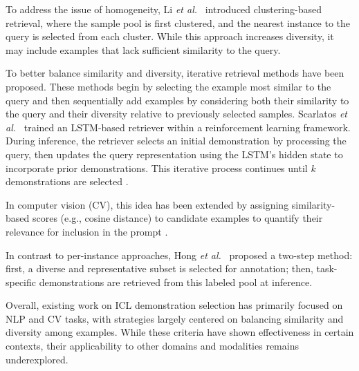 \documentclass[journal,twocolumn]{IEEEtran}
\begin{document}
To address the issue of homogeneity, Li \textit{et al.}~\cite{li-etal-2024-self-prompting} introduced clustering-based retrieval, where the sample pool is first clustered, and the nearest instance to the query is selected from each cluster. While this approach increases diversity, it may include examples that lack sufficient similarity to the query.

To better balance similarity and diversity, iterative retrieval methods have been proposed. These methods begin by selecting the example most similar to the query and then sequentially add examples by considering both their similarity to the query and their diversity relative to previously selected samples. Scarlatos \textit{et al.}~\cite{scarlatos2023reticl} trained an LSTM-based retriever within a reinforcement learning framework. During inference, the retriever selects an initial demonstration by processing the query, then updates the query representation using the LSTM's hidden state to incorporate prior demonstrations. This iterative process continues until $k$ demonstrations are selected \cite{luo2024context}.

In computer vision (CV), this idea has been extended by assigning similarity-based scores (e.g., cosine distance) to candidate examples to quantify their relevance for inclusion in the prompt \cite{zhang2023makes}.

In contrast to per-instance approaches, Hong \textit{et al.}~\cite{hongjin2022selective} proposed a two-step method: first, a diverse and representative subset is selected for annotation; then, task-specific demonstrations are retrieved from this labeled pool at inference.

Overall, existing work on ICL demonstration selection has primarily focused on NLP and CV tasks, with strategies largely centered on balancing similarity and diversity among examples. While these criteria have shown effectiveness in certain contexts, their applicability to other domains and modalities remains underexplored.




\end{document}
